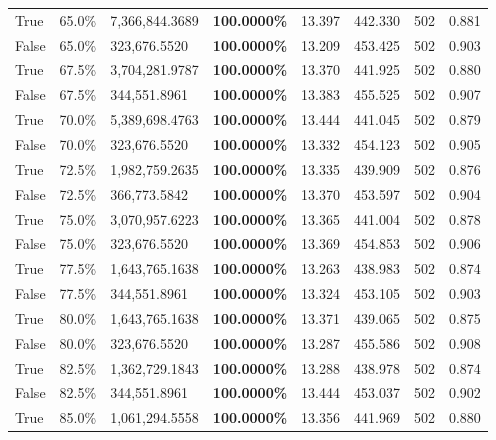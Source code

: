 \begin{table}[H]
{\begin{tabular}{lllrllll}
\cline{1-8}
True & 65.0\% & 7,366,844.3689 & \bfseries \color{red} 100.0000\% & 13.397 & 442.330 & 502 & 0.881 \\
\cline{1-8}
False & 65.0\% & 323,676.5520 & \bfseries \color{red} 100.0000\% & 13.209 & 453.425 & 502 & 0.903 \\
\cline{1-8}
True & 67.5\% & 3,704,281.9787 & \bfseries \color{red} 100.0000\% & 13.370 & 441.925 & 502 & 0.880 \\
\cline{1-8}
False & 67.5\% & 344,551.8961 & \bfseries \color{red} 100.0000\% & 13.383 & 455.525 & 502 & 0.907 \\
\cline{1-8}
True & 70.0\% & 5,389,698.4763 & \bfseries \color{red} 100.0000\% & 13.444 & 441.045 & 502 & 0.879 \\
\cline{1-8}
False & 70.0\% & 323,676.5520 & \bfseries \color{red} 100.0000\% & 13.332 & 454.123 & 502 & 0.905 \\
\cline{1-8}
True & 72.5\% & 1,982,759.2635 & \bfseries \color{red} 100.0000\% & 13.335 & 439.909 & 502 & 0.876 \\
\cline{1-8}
False & 72.5\% & 366,773.5842 & \bfseries \color{red} 100.0000\% & 13.370 & 453.597 & 502 & 0.904 \\
\cline{1-8}
True & 75.0\% & 3,070,957.6223 & \bfseries \color{red} 100.0000\% & 13.365 & 441.004 & 502 & 0.878 \\
\cline{1-8}
False & 75.0\% & 323,676.5520 & \bfseries \color{red} 100.0000\% & 13.369 & 454.853 & 502 & 0.906 \\
\cline{1-8}
True & 77.5\% & 1,643,765.1638 & \bfseries \color{red} 100.0000\% & 13.263 & 438.983 & 502 & 0.874 \\
\cline{1-8}
False & 77.5\% & 344,551.8961 & \bfseries \color{red} 100.0000\% & 13.324 & 453.105 & 502 & 0.903 \\
\cline{1-8}
True & 80.0\% & 1,643,765.1638 & \bfseries \color{red} 100.0000\% & 13.371 & 439.065 & 502 & 0.875 \\
\cline{1-8}
False & 80.0\% & 323,676.5520 & \bfseries \color{red} 100.0000\% & 13.287 & 455.586 & 502 & 0.908 \\
\cline{1-8}
True & 82.5\% & 1,362,729.1843 & \bfseries \color{red} 100.0000\% & 13.288 & 438.978 & 502 & 0.874 \\
\cline{1-8}
False & 82.5\% & 344,551.8961 & \bfseries \color{red} 100.0000\% & 13.444 & 453.037 & 502 & 0.902 \\
\cline{1-8}
True & 85.0\% & 1,061,294.5558 & \bfseries \color{red} 100.0000\% & 13.356 & 441.969 & 502 & 0.880 \\

\end{tabular}}
\end{table}
